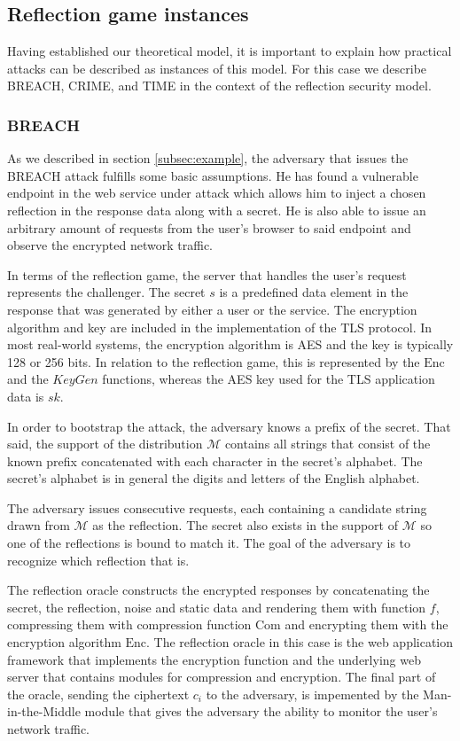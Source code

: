 \documentclass[conference, letterpaper, 10pt]{IEEEtran}
\begin{document}
\subsection{Reflection game instances}
Having established our theoretical model, it is important to explain how
practical attacks can be described as instances of this model. For this case we
describe BREACH, CRIME, and TIME in the context of the reflection security model.

\subsubsection{BREACH}
As we described in section \ref{subsec:example}, the adversary that issues the
BREACH attack fulfills some basic assumptions. He has found a vulnerable
endpoint in the web service under attack which allows him to inject a chosen
reflection in the response data along with a secret. He is also able to issue an
arbitrary amount of requests from the user's browser to said endpoint and
observe the encrypted network traffic.

In terms of the reflection game, the server that handles the user's request
represents the challenger. The secret $s$ is a predefined data element in the
response that was generated by either a user or the service. The encryption
algorithm and key are included in the implementation of the TLS protocol. In
most real-world systems, the encryption algorithm is AES and the key is
typically 128 or 256 bits. In relation to the reflection game, this is
represented by the $\textrm{Enc}$ and the $KeyGen$ functions, whereas the AES key used
for the TLS application data is $sk$.

In order to bootstrap the attack, the adversary knows a prefix of the secret.
That said, the support of the distribution $\mathcal{M}$ contains all strings
that consist of the known prefix concatenated with each character in the
secret's alphabet. The secret's alphabet is in general the digits and letters
of the English alphabet.

The adversary issues consecutive requests, each containing a candidate string
drawn from $\mathcal{M}$ as the reflection. The secret also exists in the
support of $\mathcal{M}$ so one of the reflections is bound to match it. The
goal of the adversary is to recognize which reflection that is.

The reflection oracle constructs the encrypted responses by concatenating the
secret, the reflection, noise and static data and rendering them with function
$f$, compressing them with compression function $\textrm{Com}$ and encrypting them with
the encryption algorithm $\textrm{Enc}$. The reflection oracle in this case is the web
application framework that implements the encryption function and the underlying
web server that contains modules for compression and encryption. The final part
of the oracle, sending the ciphertext $c_i$ to the adversary, is impemented by
the Man-in-the-Middle module that gives the adversary the ability to monitor the
user's network traffic.
\end{document}
